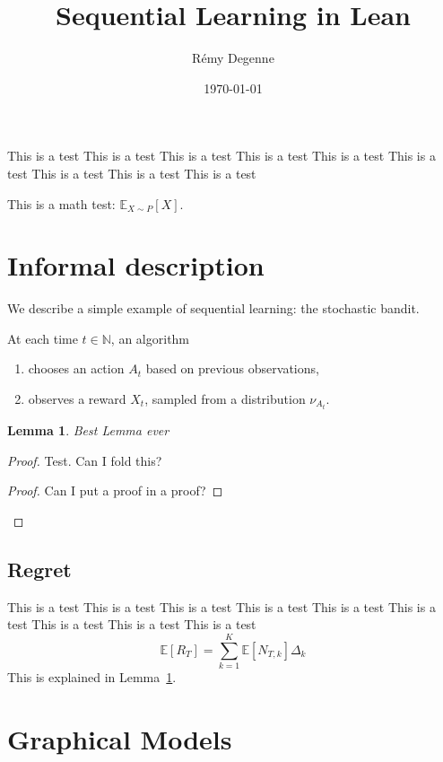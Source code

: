 \documentclass{article}
\title{Sequential Learning in Lean}
\author{Rémy Degenne}
\date{\today}
\newtheorem{lemma}[theorem]{Lemma}
\begin{document}
\maketitle

This is a test This is a test This is a test This is a test This is a test This is a test This is a test This is a test This is a test 

This is a math test: $\mathbb{E}_{X \sim P}[X]$.

\section{Informal description}

We describe a simple example of sequential learning: the stochastic bandit.

At each time $t \in \mathbb{N}$, an algorithm
\begin{enumerate}
	\item chooses an action $A_t$ based on previous observations,
	\item observes a reward $X_t$, sampled from a distribution $\nu_{A_t}$.
\end{enumerate}

\begin{lemma}\label{lem:best}
Best Lemma ever
\end{lemma}
\begin{proof}
Test. Can I fold this?
\begin{proof}
Can I put a proof in a proof?
\end{proof}
\end{proof}

\subsection{Regret}

This is a test This is a test This is a test This is a test This is a test This is a test This is a test This is a test This is a test 
\begin{equation}
\mathbb{E}[R_T] = \sum_{k=1}^K \mathbb{E}[N_{T,k}] \Delta_k 
\end{equation}
This is explained in Lemma~\ref{lem:best}.

\cite{lattimore2020bandit}

\section{Graphical Models}
\label{sec:graphical_models}




\end{document}
